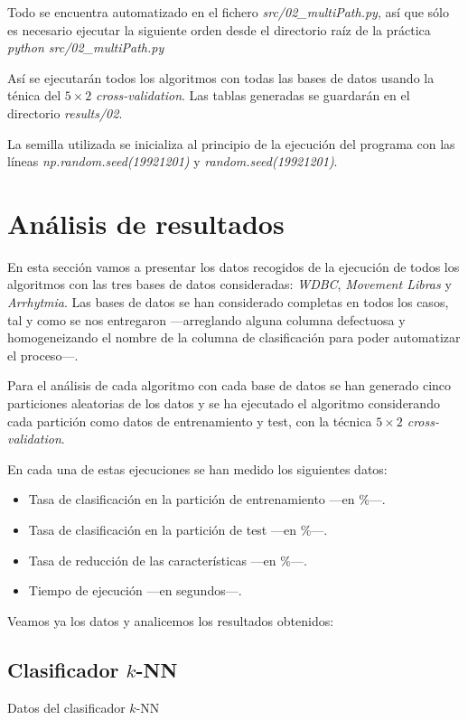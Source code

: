 \documentclass[a4paper, 11pt, titlepage]{article}
\begin{document}
    Todo se encuentra automatizado en el fichero \emph{src/02\_multiPath.py}, así que sólo es necesario ejecutar la siguiente orden desde el directorio raíz de la práctica \emph{python src/02\_multiPath.py}

    Así se ejecutarán todos los algoritmos con todas las bases de datos usando la ténica del  $5\times2$ \emph{cross-validation}. Las tablas generadas se guardarán en el directorio \emph{results/02}.

    La semilla utilizada se inicializa al principio de la ejecución del programa con las líneas \emph{np.random.seed(19921201)} y \emph{random.seed(19921201)}.


    \section{Análisis de resultados}

    En esta sección vamos a presentar los datos recogidos de la ejecución de todos los algoritmos con las tres bases de datos consideradas: \emph{WDBC}, \emph{Movement Libras} y \emph{Arrhytmia}. Las bases de datos se han considerado completas en todos los casos, tal y como se nos entregaron ---arreglando alguna columna defectuosa y homogeneizando el nombre de la columna de clasificación para poder automatizar el proceso---.

    Para el análisis de cada algoritmo con cada base de datos se han generado cinco particiones aleatorias de los datos y se ha ejecutado el algoritmo considerando cada partición como datos de entrenamiento y test, con la técnica \emph{$5\times2$ cross-validation}.

    En cada una de estas ejecuciones se han medido los siguientes datos:
    \begin{itemize}
        \item Tasa de clasificación en la partición de entrenamiento ---en \%---.
        \item Tasa de clasificación en la partición de test ---en \%---.
        \item Tasa de reducción de las características ---en \%---.
        \item Tiempo de ejecución ---en segundos---.
    \end{itemize}

    Veamos ya los datos y analicemos los resultados obtenidos:

    \subsection{Clasificador $k$-NN}
    \begin{table}[!htb]
        \maketable{\dataKNN}
        \caption{Datos del clasificador $k$-NN}
        \label{knn}
    \end{table}
\end{document}
